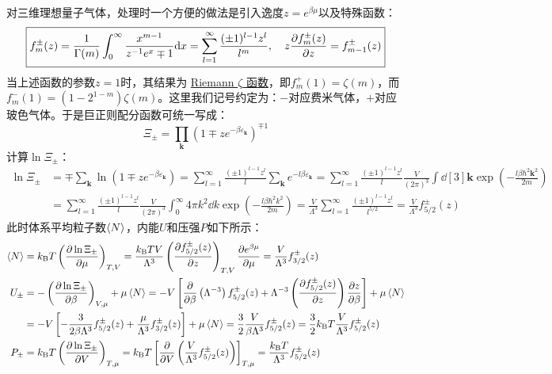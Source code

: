 对三维理想量子气体，处理时一个方便的做法是引入逸度$z=e^{\beta\mu}$以及特殊函数：
\begin{equation}\label{eq:special_function}
\boxed{f_m^\pm(z)=\frac{1}{\Gamma(m)}\int_0^\infty \frac{x^{m-1}}{z^{-1}e^x\mp 1}\dd x=\sum_{l=1}^{\infty}\frac{(\pm 1)^{l-1}z^l}{l^m}, \quad z\pdv{f_m^{\pm}(z)}{z}=f_{m-1}^{\pm}(z)}
\end{equation}
当上述函数的参数$z=1$时，其结果为 \href{https://en.wikipedia.org/wiki/Riemann_zeta_function}{Riemann $\zeta$ 函数}，即$f_m^+(1)=\zeta(m)$，而$f_m^-(1)=(1-2^{1-m})\zeta(m)$。这里我们记号约定为：$-$对应费米气体，$+$对应玻色气体。于是巨正则配分函数可统一写成：
\[\Xi_{\pm}=\prod_{\mathbf{k}}\left(1\mp ze^{-\beta\varepsilon_{\mathbf{k}}}\right)^{\mp1}\]
计算$\ln\Xi_{\pm}$：
\[\begin{aligned}
\ln\Xi_{\pm}&=\mp\sum_{\mathbf{k}}\ln\left(1\mp ze^{-\beta\varepsilon_{\mathbf{k}}}\right)=\sum_{l=1}^{\infty}\frac{(\pm1)^{l-1}z^l}{l}\sum_{\mathbf{k}}e^{-l\beta\varepsilon_{\mathbf{k}}}=\sum_{l=1}^{\infty}\frac{(\pm1)^{l-1}z^l}{l}\frac{V}{(2\pi)^3}\int \dd[3]{\mathbf{k}}\exp\left(-\frac{l\beta\hbar^2\mathbf{k}^2}{2m}\right)\\
&=\sum_{l=1}^{\infty}\frac{(\pm1)^{l-1}z^l}{l}\frac{V}{(2\pi)^3}\int_0^{\infty}4\pi k^2\dd{k}\exp\left(-\frac{l\beta\hbar^2k^2}{2m}\right)=\frac{V}{\Lambda^3}\sum_{l=1}^{\infty}\frac{(\pm1)^{l-1}z^l}{l^{5/2}}=\frac{V}{\Lambda^3}f_{5/2}^{\pm}(z)
\end{aligned}\]
此时体系平均粒子数$\expval{N}$，内能$U$和压强$P$如下所示：
\[\begin{aligned}
\expval{N}&=k_{\rm B}T\left(\pdv{\ln\Xi_\pm}{\mu}\right)_{T,V}=\frac{k_{\rm B}TV}{\Lambda^3}\left(\pdv{f_{5/2}^{\pm}(z)}{z}\right)_{T,V}\pdv{e^{\beta\mu}}{\mu}=\frac{V}{\Lambda^3}f_{3/2}^{\pm}(z)\\
U_{\pm}&=-\left(\pdv{\ln\Xi_\pm}{\beta}\right)_{V,\mu}+\mu \expval{N}=-V\left[\pdv{\beta}\left(\Lambda^{-3}\right)f_{5/2}^{\pm}(z)+\Lambda^{-3}\left(\pdv{f_{5/2}^{\pm}(z)}{z}\right)\pdv{z}{\beta}\right]+\mu \expval{N}\\
&=-V\left[-\frac{3}{2\beta\Lambda^3}f_{5/2}^{\pm}(z)+\frac{\mu}{\Lambda^3}f_{3/2}^{\pm}(z)\right]+\mu \expval{N}=\frac{3}{2}\frac{V}{\beta\Lambda^3}f_{5/2}^{\pm}(z)=\frac{3}{2}k_{\rm B}T\frac{V}{\Lambda^3}f_{5/2}^{\pm}(z)\\
P_\pm&=k_{\rm B}T\left(\pdv{\ln\Xi_\pm}{V}\right)_{T,\mu}=k_{\rm B}T\left[\pdv{}{V}\left(\frac{V}{\Lambda^3}f_{5/2}^{\pm}(z)\right)\right]_{T,\mu}=\frac{k_{\rm B}T}{\Lambda^3}f_{5/2}^{\pm}(z)\\
\end{aligned}\]

